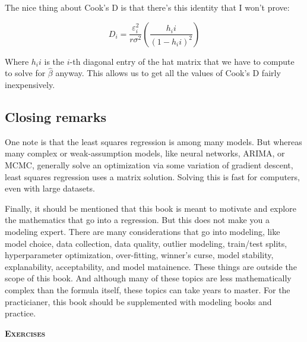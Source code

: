 \documentclass{amsbook}
\begin{document}
The nice thing about Cook's D is that there's this identity that I won't prove:

$$
D_i = \frac{\varepsilon_i^2}{r\sigma^2}\left(\frac{h_ii}{(1-h_ii)^2}\right)
$$

Where $h_ii$ is the $i$-th diagonal entry of the hat matrix that we have to compute to solve for $\hat\beta$ anyway.  This allows us to get all the values of Cook's D fairly inexpensively.

\subsection{Closing remarks}

One note is that the least squares regression is among many models.  But whereas many complex or weak-assumption models, like neural networks, ARIMA, or MCMC, generally solve an optimization via some variation of gradient descent, least squares regression uses a matrix solution.  Solving this is fast for computers, even with large datasets.

Finally, it should be mentioned that this book is meant to motivate and explore the mathematics that go into a regression.  But this does not make you a modeling expert.  There are many considerations that go into modeling, like model choice, data collection, data quality, outlier modeling, train/test splits, hyperparameter optimization, over-fitting, winner's curse, model stability, explanability, acceptability, and model matainence.  These things are outside the scope of this book.  And although many of these topics are less mathematically complex than the formula itself, these topics can take years to master.  For the practicianer, this book should be supplemented with modeling books and practice.

{\bfseries\scshape\Large Exercises}
\end{document}
